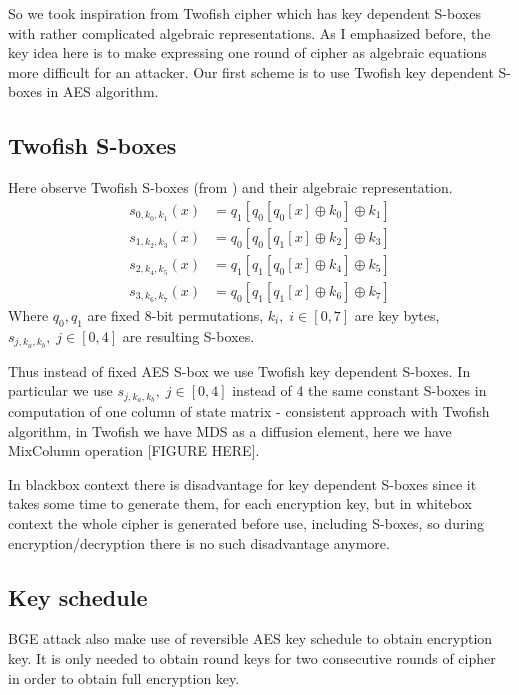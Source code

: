 \documentclass[11pt,oneside,final]{fithesis2}
\begin{document}
    So we took inspiration from Twofish \cite{twofish} cipher which has key dependent S-boxes with rather
    complicated algebraic representations. As I emphasized before, the key idea here is to make expressing one round of cipher as algebraic equations more difficult for an attacker.
    Our first scheme is to use Twofish key dependent S-boxes in AES algorithm. 

    \subsection{Twofish S-boxes}
    Here observe Twofish S-boxes (from \cite{twofish} \citep{Schneier98twofish:a}) and their algebraic representation.
    \begin{subequations}\label{eq:twofish_sbox}
    \begin{align}
	s_{0,k_0,k_1}\left(x\right) &= q_1\left[q_0\left[q_0\left[x\right] \oplus k_0 \right] \oplus k_1 \right]\\
	s_{1,k_2,k_3}\left(x\right) &= q_0\left[q_0\left[q_1\left[x\right] \oplus k_2 \right] \oplus k_3 \right]\\
	s_{2,k_4,k_5}\left(x\right) &= q_1\left[q_1\left[q_0\left[x\right] \oplus k_4 \right] \oplus k_5 \right]\\
	s_{3,k_6,k_7}\left(x\right) &= q_0\left[q_1\left[q_1\left[x\right] \oplus k_6 \right] \oplus k_7 \right]
    \end{align}
    \end{subequations}
    Where $q_0, q_1$ are fixed 8-bit permutations, $k_i,\; i \in [0,7]$ are key bytes, $s_{j,k_a,k_b},\; j \in [0,4]$ are resulting S-boxes.

    Thus instead of fixed AES S-box we use Twofish key dependent S-boxes. In particular we use $s_{j,k_a,k_b},\; j \in [0,4]$ instead of 4 the same constant
    S-boxes in computation of one column of state matrix - consistent approach with Twofish algorithm, in Twofish we have MDS as a diffusion element,
    here we have MixColumn operation [FIGURE HERE]. 

    In blackbox context there is disadvantage for key dependent S-boxes since it takes some time to generate them, for each encryption key, but in whitebox context
    the whole cipher is generated before use, including S-boxes, so during encryption/decryption there is no such disadvantage anymore.
   
    \subsection{Key schedule}
    BGE attack also make use of reversible AES key schedule to obtain encryption key. It is only needed to obtain round keys for two consecutive
    rounds of cipher in order to obtain full encryption key.
\end{document}
